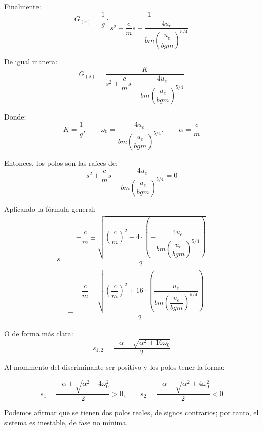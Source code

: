 Finalmente:
\begin{equation*}
    G_{(s)} = \frac{1}{g} \cdot \dfrac{1}{s^2 + \dfrac{c}{m}s - \dfrac{4u_{e}}{bm \left( \dfrac{u_{e}}{bgm} \right)^{5/4}}}
\end{equation*}

De igual manera:
\begin{equation*}
    G_{(s)} = \dfrac{K}{s^2 + \dfrac{c}{m}s - \dfrac{4u_{e}}{bm \left( \dfrac{u_{e}}{bgm} \right)^{5/4}}}
\end{equation*}

Donde:
\begin{equation*}
    K = \frac{1}{g},
    \qquad 
    \omega_0 = \dfrac{4u_{e}}{bm \left( \dfrac{u_{e}}{bgm} \right)^{5/4}}, \qquad 
    \alpha = \frac{c}{m}
\end{equation*}

Entonces, los polos son las raíces de:
\begin{equation*}
   s^2 + \dfrac{c}{m}s -\dfrac{4u_{e}}{bm \left( \dfrac{u_{e}}{bgm} \right)^{5/4}} = 0 
\end{equation*}

Aplicando la fórmula general:
\begin{align*}
    s 
    &= 
        \dfrac{ 
            -\dfrac{c}{m} \pm 
            \sqrt{ 
                \left( \dfrac{c}{m} \right)^2 
                - 4 
                \cdot 
                \left( -\dfrac{4u_e}{bm \left( \dfrac{u_e}{bgm} \right)^{5/4}} \right)
            }
        }{2} \\[1ex]
    &= 
        \dfrac{ 
           - \dfrac{c}{m} \pm 
            \sqrt{ 
                \left( \dfrac{c}{m} \right)^2 
                + 16 
                \cdot 
                \left( \dfrac{u_e}{bm \left( \dfrac{u_e}{bgm} \right)^{5/4}} \right)
            }
        }{2}
\end{align*}


O de forma más clara:
\begin{equation*}
    s_{1,2} = \frac{-\alpha \pm \sqrt{\alpha^2 + 16\omega_0}}{2}
\end{equation*}

Al mommento del discriminante ser positivo y los polos tener la forma:

\begin{equation*}
    s_1 = \frac{-\alpha + \sqrt{\alpha^2 + 4\omega_0^2}}{2} > 0, \qquad
    s_2 = \frac{-\alpha - \sqrt{\alpha^2 + 4\omega_0^2}}{2} < 0
\end{equation*}

Podemos afirmar que se tienen dos polos reales, de signos contrarios; por tanto, el sistema es inestable, de fase no mínima.

